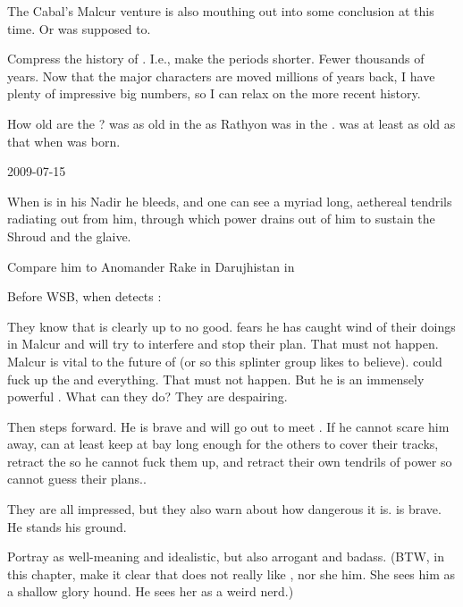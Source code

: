 The Cabal's Malcur venture is also mouthing out into some conclusion at this time. 
Or was supposed to. 



Compress the history of \Miith.
I.e., make the periods shorter. 
Fewer thousands of years. 
Now that the \draconic major characters are moved millions of years back, I have plenty of impressive big numbers, so I can relax on the more recent history. 

How old are the \dragons?
\Nzessuacrith was as old in the \secondbanewar as Rathyon was in the \thirdbanewar.
\Ishnaruchaefir was at least as old as that when \Nzessuacrith was born. 



2009-07-15

When \Ishnaruchaefir is in his Nadir he bleeds, and one can see a myriad long, aethereal tendrils radiating out from him, through which power drains out of him to sustain the Shroud and the glaive. 

Compare him to Anomander Rake in Darujhistan in \cite{}

Before WSB, when \Achsah detects \Ishnaruchaefir:

  They know that \Ishnaruchaefir is clearly up to no good.
  \Urizeth fears he has caught wind of their doings in Malcur and will try to interfere and stop their plan.
  That must not happen. 
  Malcur is vital to the future of \CiriathSepher (or so this splinter group likes to believe). 
  \Ishnaruchaefir could fuck up the \noggyaleth and everything. 
  That must not happen. 
  But he is an immensely powerful \shaeeroth \dragon.
  What can they do?
  They are despairing.
  
  Then \Teshrial steps forward. 
  He is brave and will go out to meet \Ishnaruchaefir. 
  If he cannot scare him away, \Teshrial can at least keep \Ishnaruchaefir at bay long enough for the others to cover their tracks, retract the \noggyaleth so he cannot fuck them up, and retract their own tendrils of \vertex power so \Ishnaruchaefir cannot guess their plans..
  
  They are all impressed, but they also warn \Teshrial about how dangerous it is.
  \Teshrial is brave. 
  He stands his ground. 
  
  Portray \Teshrial as well-meaning and idealistic, but also arrogant and badass. 
  (BTW, in this chapter, make it clear that \Teshrial does not really like \Urizeth, nor she him.
  She sees him as a shallow glory hound.
  He sees her as a weird nerd.)
  
